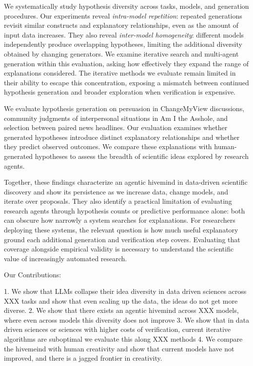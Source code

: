 
We systematically study hypothesis diversity across tasks, models, and generation procedures. Our experiments reveal \emph{intra-model repetition}: repeated generations revisit similar constructs and explanatory relationships, even as the amount of input data increases. They also reveal \emph{inter-model homogeneity}: different models independently produce overlapping hypotheses, limiting the additional diversity obtained by changing generators. We examine iterative search and multi-agent generation within this evaluation, asking how effectively they expand the range of explanations considered. The iterative methods we evaluate remain limited in their ability to escape this concentration, exposing a mismatch between continued hypothesis generation and broader exploration when verification is expensive.

We evaluate hypothesis generation on persuasion in ChangeMyView discussions, community judgments of interpersonal situations in Am I the Asshole, and selection between paired news headlines. Our evaluation examines whether generated hypotheses introduce distinct explanatory relationships and whether they predict observed outcomes. We compare these explanations with human-generated hypotheses to assess the breadth of scientific ideas explored by research agents.

Together, these findings characterize an agentic hivemind in data-driven scientific discovery and show its persistence as we increase data, change models, and iterate over proposals. They also identify a practical limitation of evaluating research agents through hypothesis counts or predictive performance alone: both can obscure how narrowly a system searches for explanations. For researchers deploying these systems, the relevant question is how much useful explanatory ground each additional generation and verification step covers. Evaluating that coverage alongside empirical validity is necessary to understand the scientific value of increasingly automated research.



Our Contributions:

1. We show that LLMs collapse their idea diversity in data driven sciences across XXX tasks and show that even scaling up the data, the ideas do not get more diverse.
2. We show that there exists an agentic hivemind across XXX models, where even across models this diversity does not improve
3. We show that in data driven sciences or sciences with higher costs of verification, current iterative algorithms are suboptimal we evaluate this along XXX methods
4. We compare the hivemeind with human creativity and show that current models have not improved, and there is a jagged frontier in creativity.

